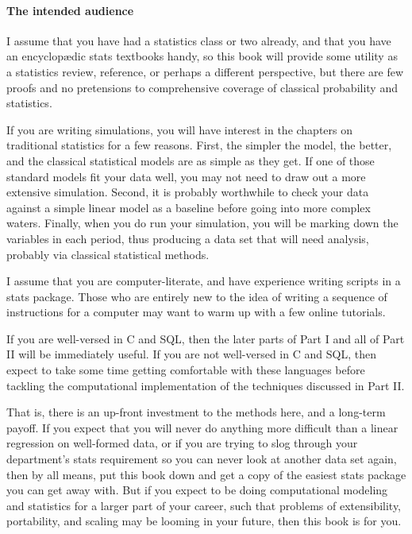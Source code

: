 \paragraph{The intended audience}
I assume that you have had a statistics class or two already, and that
you have an encyclop\ae{}dic stats textbooks handy, so this book will
provide some utility as a statistics review, reference, or perhaps a
different perspective, but there are few proofs and no pretensions to
comprehensive coverage of classical probability and statistics.

If you are writing simulations, you will have interest in the chapters
on traditional statistics for a few reasons. First, 
the simpler the model, the better, and the classical statistical models
are as simple as they get. If one of those standard models fit your data well, you may not need to
draw out a more extensive simulation. Second, it is probably worthwhile to check
your data against a simple linear model as a baseline before going into
more complex waters. Finally, when you do run your simulation, you will
be marking down the variables in each period, thus producing a data set
that will need analysis, probably via classical statistical methods.

I assume that you are computer-literate, and have experience writing
scripts in a stats package. Those who are entirely new to the idea of
writing a sequence of instructions for a computer may want to warm up
with a few online tutorials.

If you are well-versed in C and SQL, then the later parts of Part I and
all of Part II will be immediately useful.
If you are not well-versed in C and SQL, then expect to take some time
getting comfortable with these languages before tackling the computational
implementation of the techniques discussed in Part II.

That is, there is an up-front investment to the methods here, and a
long-term payoff. If you expect that you will never do anything more
difficult than a linear regression on well-formed  data, or
if you are trying to slog through your department's stats requirement
so you can never look at another data set again, then by all means, put
this book down and get a copy of the easiest stats package you can
get away with. But if you expect to be doing computational modeling
and statistics for a larger part of your career, such that problems of
extensibility, portability, and scaling may be looming in your future,
then this book is for you.

